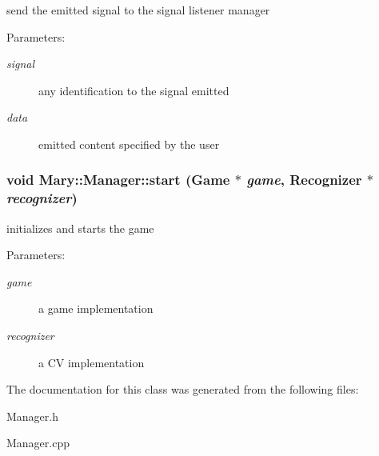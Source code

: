 send the emitted signal to the signal listener manager \begin{Desc}
\item[Parameters:]
\begin{description}
\item[{\em signal}]any identification to the signal emitted \item[{\em data}]emitted content specified by the user \end{description}
\end{Desc}
\hypertarget{class_mary_1_1_manager_6b46c90621b16345ff560417d165ebcd}{
\subsubsection[start]{\setlength{\rightskip}{0pt plus 5cm}void Mary::Manager::start ({\bf Game} $\ast$ {\em game}, \/  {\bf Recognizer} $\ast$ {\em recognizer})}}
\label{class_mary_1_1_manager_6b46c90621b16345ff560417d165ebcd}


initializes and starts the game \begin{Desc}
\item[Parameters:]
\begin{description}
\item[{\em game}]a game implementation \item[{\em recognizer}]a CV implementation \end{description}
\end{Desc}


The documentation for this class was generated from the following files:\begin{CompactItemize}
\item 
Manager.h\item 
Manager.cpp\end{CompactItemize}
